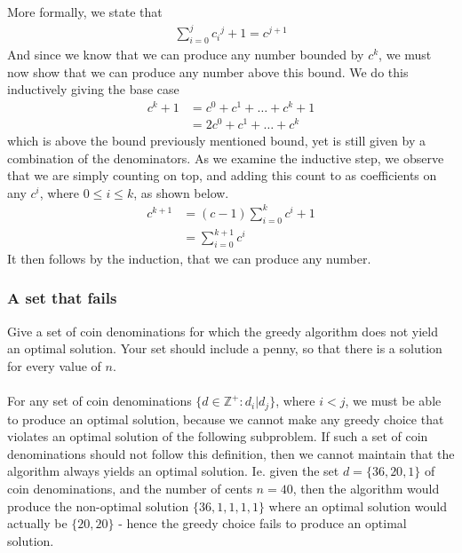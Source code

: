 \documentclass[11pt,english]{article}
\begin{document}
More formally, we state that
\begin{align}
	\sum_{i=0}^{j} c{_i}^{j} + 1 = c^{j+1}
\end{align}
And since we know that we can produce any number bounded by $c^k$, we must
now show that we can produce any number above this bound. We do this
inductively giving the base case
\begin{align}
	c^k + 1 &= c^0 + c^1 + \dots + c^k + 1\\
	&= 2c^0 + c^1 + \dots + c^k
\end{align}
which is above the bound previously mentioned bound, yet is still given by a
combination of the denominators. As we examine the inductive step, we observe
that we are simply counting on top, and adding this count to as coefficients
on any $c^i$, where $0 \leq i \leq k$, as shown below.
\begin{align}
	c^{k+1} &= (c - 1)\sum_{i=0}^{k}{c^i} + 1\\
	&= \sum_{i=0}^{k+1}{c^i} \nonumber
\end{align}
It then follows by the induction, that we can produce any number.

\subsubsection*{A set that fails}
\large{Give a set of coin denominations for which the greedy algorithm
does not yield an optimal solution. Your set should include a penny, so
that there is a solution for every value of $n$.}
\\\\
For any set of coin denominations
$\{d \in \mathbb{Z}^{+} : d_i | d_{j}\}$, where $i < j$, we must be able to
produce an optimal solution, because we cannot make any greedy choice that
violates an optimal solution of the following subproblem. If such a set of
coin denominations should not follow this definition, then we cannot maintain
that the algorithm always yields an optimal solution. Ie. given the set
$d = \{36, 20, 1\}$ of coin denominations, and the number of cents $n = 40$,
then the algorithm would produce the non-optimal solution $\{36, 1, 1, 1, 1\}$
where an optimal solution would actually be $\{20, 20\}$ - hence the greedy
choice fails to produce an optimal solution.
\end{document}

